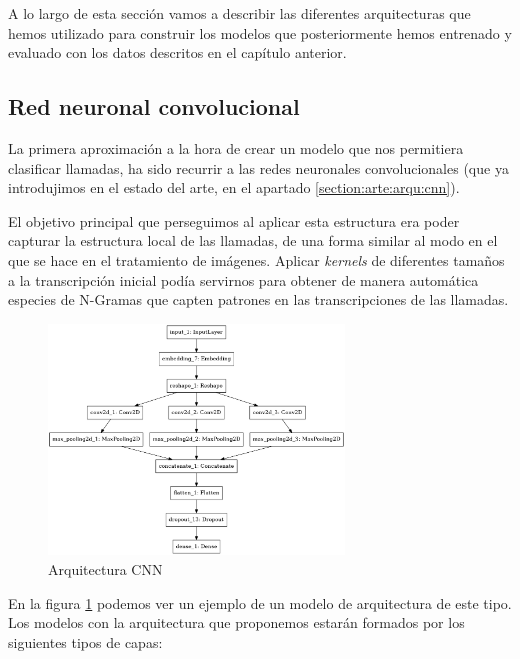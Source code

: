 A lo largo de esta sección vamos a describir las diferentes arquitecturas que hemos utilizado para construir los modelos que posteriormente hemos entrenado y evaluado con los datos descritos en el capítulo anterior. 

\subsection{Red neuronal convolucional}

La primera aproximación a la hora de crear un modelo que nos permitiera clasificar llamadas, ha sido recurrir a las redes neuronales convolucionales (que ya introdujimos en el estado del arte, en el apartado \ref{section:arte:arqu:cnn}). 

El objetivo principal que perseguimos al aplicar esta estructura era poder capturar la estructura local de las llamadas, de una forma similar al modo en el que se hace en el tratamiento de imágenes. Aplicar \textit{kernels} de diferentes tamaños a la transcripción inicial podía servirnos para obtener de manera automática especies de N-Gramas  que capten patrones en las transcripciones de las llamadas. 

\begin{figure}[!ht]
	\centering
	\includegraphics[width=0.7\textwidth]{images/super/arq_cnn}
	\caption{Arquitectura CNN}
	\label{fig:arqcnn}
\end{figure}


En la figura \ref{fig:arqcnn} podemos ver un ejemplo de un modelo de arquitectura de este tipo. Los modelos con la arquitectura que proponemos estarán formados por los siguientes tipos de capas: 

